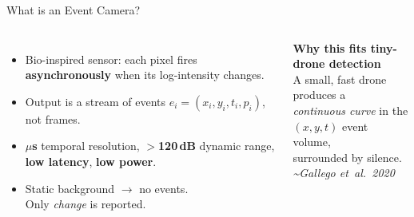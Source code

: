 \documentclass[aspectratio=169,11pt]{beamer}
\newcommand{\srctag}[1]{{\footnotesize\itshape\color{mutedgray}\textasciitilde#1}}
\begin{document}
\begin{frame}{What is an Event Camera?}
  \vspace{0.2em}
  \begin{columns}[T,onlytextwidth]
    \begin{itemize}
      \setlength\itemsep{0.5em}
      \item Bio-inspired sensor: each pixel fires \textbf{asynchronously}
            when its log-intensity changes.
      \item Output is a stream of events
            $e_i = (x_i, y_i, t_i, p_i)$,
            not frames.
      \item \textbf{$\mu$s} temporal resolution, \textbf{$>$120\,dB} dynamic range,
            \textbf{low latency}, \textbf{low power}.
      \item Static background $\to$ no events.\\
            Only \emph{change} is reported.
    \end{itemize}

    \begin{darkbox}
      \centering
      \textbf{Why this fits tiny-drone detection}\\[0.4em]
      A small, fast drone produces a\\
      \emph{continuous curve} in the\\
      $(x,y,t)$ event volume,\\
      surrounded by silence.\\[0.4em]
      \srctag{Gallego et~al.\ 2020}
    \end{darkbox}
  \end{columns}
\end{frame}
\end{document}
